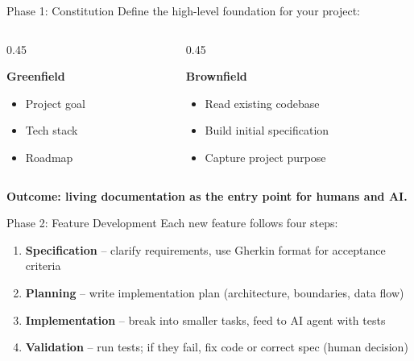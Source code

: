 \documentclass[aspectratio=169]{beamer}
\begin{document}
\begin{frame}{Phase 1: Constitution}
    Define the high-level foundation for your project:

    \vspace{0.4cm}
    \begin{columns}[T]
        \begin{column}{0.45\textwidth}
            \colorbox{utu_green!20}{\parbox{0.95\textwidth}{\centering\textbf{Greenfield}}}
            \vspace{0.3cm}
            \begin{itemize}
                \item Project goal
                \item Tech stack
                \item Roadmap
            \end{itemize}
        \end{column}
        \begin{column}{0.45\textwidth}
            \colorbox{utu_blue!20}{\parbox{0.95\textwidth}{\centering\textbf{Brownfield}}}
            \vspace{0.3cm}
            \begin{itemize}
                \item Read existing codebase
                \item Build initial specification
                \item Capture project purpose
            \end{itemize}
        \end{column}
    \end{columns}

    \vspace{0.4cm}
    \colorbox{utu_blue!20}{\parbox{0.9\textwidth}{
        \centering
        \textbf{Outcome: living documentation as the entry point for humans and AI.}
    }}
\end{frame}

\begin{frame}{Phase 2: Feature Development}
    Each new feature follows four steps:

    \vspace{0.4cm}
    \begin{enumerate}
        \item \textbf{Specification} -- clarify requirements, use Gherkin format for acceptance criteria
        \item \textbf{Planning} -- write implementation plan (architecture, boundaries, data flow)
        \item \textbf{Implementation} -- break into smaller tasks, feed to AI agent with tests
        \item \textbf{Validation} -- run tests; if they fail, fix code or correct spec (human decision)
    \end{enumerate}
\end{frame}
\end{document}
